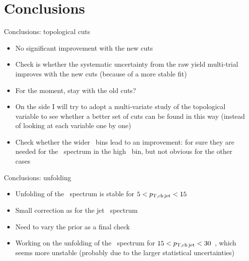 \documentclass[xcolor={usenames,dvipsnames}]{beamer}
\begin{document}
\section{Conclusions}

\begin{frame}{Conclusions: topological cuts}
\begin{itemize}
\item No significant improvement with the new cuts
\item Check is whether the systematic uncertainty from the raw yield multi-trial improves with the new cuts (because of a more stable fit)
\item For the moment, stay with the old cuts?
\item On the side I will try to adopt a multi-variate study of the topological variable to see whether a better set of cuts can be found in this way (instead of looking at each variable one by one)
\item Check whether the wider \ptd\ bins lead to an improvement: for sure they are needed for the \zpar\ spectrum in the high \ptchjet\ bin, but not obvious for the other cases
\end{itemize}
\end{frame}

\begin{frame}{Conclusions: unfolding}
\begin{itemize}
\item Unfolding of the \zpar\ spectrum is stable for $5<p_{\mathrm{T,ch\, jet}}<15$~\GeVc
\item Small correction as for the jet \pt\ spectrum
\item Need to vary the prior as a final check
\item Working on the unfolding of the \zpar\ spectrum for $15<p_{\mathrm{T,ch\, jet}}<30$~\GeVc, which seems more unstable (probably due to the larger statistical uncertainties)
\end{itemize}
\end{frame}
\end{document}

